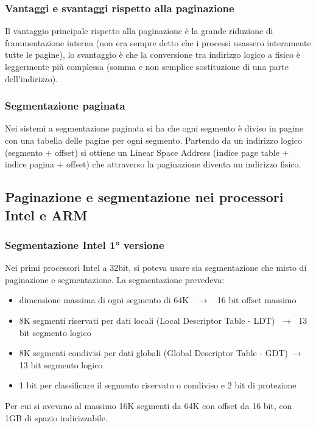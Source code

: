 \documentclass[a4paper]{article}
\begin{document}
\subsubsection*{Vantaggi e svantaggi rispetto alla paginazione}
Il vantaggio principale rispetto alla paginazione è la grande riduzione di frammentazione interna (non era sempre detto che i
processi usassero interamente tutte le pagine), lo svantaggio è che la conversione tra indirizzo logico a fisico è leggermente
più complessa (somma e non semplice sostituzione di una parte dell'indirizzo).

\subsubsection*{Segmentazione paginata}
Nei sistemi a segmentazione paginata si ha che ogni segmento è diviso in pagine con una tabella delle pagine per ogni segmento.
Partendo da un indirizzo logico (segmento + offset) si ottiene un Linear Space Address (indice page table + indice pagina + offset)
che attraverso la paginazione diventa un indirizzo fisico.


\subsection{Paginazione e segmentazione nei processori Intel e ARM}
\subsubsection*{Segmentazione Intel 1° versione}
Nei primi processori Intel a 32bit, si poteva usare sia segmentazione che misto di paginazione e segmentazione. La segmentazione
prevedeva:
\begin{itemize}
	\item dimensione massima di ogni segmento di 64K \(\;\;\rightarrow\;\;\) 16 bit offset massimo
	\item 8K segmenti riservati per dati locali (Local Descriptor Table - LDT) \(\;\rightarrow\;\) 13 bit segmento logico 
	\item 8K segmenti condivisi per dati globali (Global Descriptor Table - GDT)\(\;\rightarrow\;\) 13 bit segmento logico
	\item 1 bit per classificare il segmento riservato o condiviso e 2 bit di protezione
\end{itemize}
Per cui si avevano al massimo 16K segmenti da 64K con offset da 16 bit, con 1GB di spazio indirizzabile.
\end{document}
